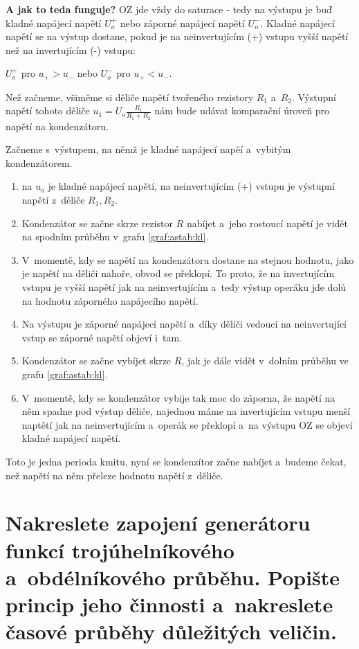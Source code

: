 \documentclass[a4paper,12pt]{article}   %
\begin{document}
\textbf{A jak to teda funguje?} OZ jde vždy do saturace - tedy na výstupu je buď kladné napájecí napětí $U_o^+$ nebo záporné napájecí napětí $U_o^-$. Kladné napájecí napětí se na výstup dostane, pokud je na neinvertujícím (+) vstupu vyšší napětí než na invertujícím (-) vstupu: 

\begin{center}
    $U_o^+$ pro $u_+ > u_-$ nebo $U_o^-$ pro $u_+ < u_-$.
\end{center}

Než začneme, všiměme si děliče napětí tvořeného rezistory $R_1$ a~$R_2$. Výstupní napětí tohoto děliče $u_1 = U_o \frac{R_1}{R_1 + R_2}$ nám bude udávat komparační úroveň pro napětí na kondenzátoru.

Začneme s~výstupem, na němž je kladné napájecí napěí a~vybitým kondenzátorem.

\begin{enumerate}
    \item na $u_o$ je kladné napájecí napětí, na neinvertujícím (+) vstupu je výstupní napětí z~děliče $R_1, R_2$.
    \item Kondenzátor se začne skrze rezistor $R$ nabíjet a~jeho rostoucí napětí je vidět na spodním průběhu v~grafu \ref{graf:astab:kl}.
    \item V~momentě, kdy se napětí na kondenzátoru dostane na stejnou hodnotu, jako je napětí na děliči nahoře, obvod se překlopí. To proto, že na invertujícím vstupu je vyšší napětí jak na neinvertujícím a~tedy výstup operáku jde dolů na hodnotu záporného napájecího napětí.
    \item Na výstupu je záporné napájecí napětí a~díky děliči vedoucí na neinvertující vstup se záporné napětí objeví i~tam.
    \item Kondenzátor se začne vybíjet skrze $R$, jak je dále vidět v~dolním průběhu ve grafu \ref{graf:astab:kl}.
    \item V~momentě, kdy se kondenzátor vybije tak moc do záporna, že napětí na něm spadne pod výstup děliče, najednou máme na invertujícím vstupu menší naptětí jak na neinvertujícím a~operák se překlopí a~na výstupu OZ se objeví kladné napájecí napětí.
\end{enumerate}
Toto je jedna perioda kmitu, nyní se kondenzítor začne nabíjet a~budeme čekat, než napětí na něm přeleze hodnotu napětí z~děliče.






\section{Nakreslete zapojení generátoru funkcí {trojúhelníkového a~obdélníkového průběhu}. Popište princip jeho činnosti a~nakreslete časové průběhy důležitých veličin.}
\end{document}
